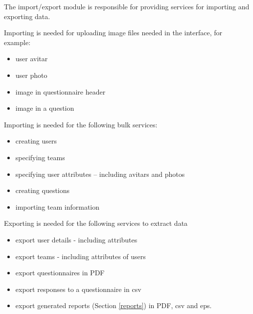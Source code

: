 The import/export module is responsible for providing services for importing and exporting data. 

Importing is needed for uploading image files needed in the interface, for example:
\begin{itemize}
\item user avitar
\item user photo
\item image in questionnaire header
\item image in a question
\end{itemize}

Importing is needed for the following bulk services:
\begin{itemize}
\item creating users
\item specifying teams
\item specifying user attributes -- including avitars and photos
\item creating questions
\item importing team information
\end{itemize}

Exporting is needed for the following services to extract data
\begin{itemize}
\item export user details - including attributes
\item export teams - including attributes of users
\item export questionnaires in PDF
\item export responses to a questionnaire in csv
\item export generated reports (Section \ref{reports}) in PDF, csv and eps.
\end{itemize}